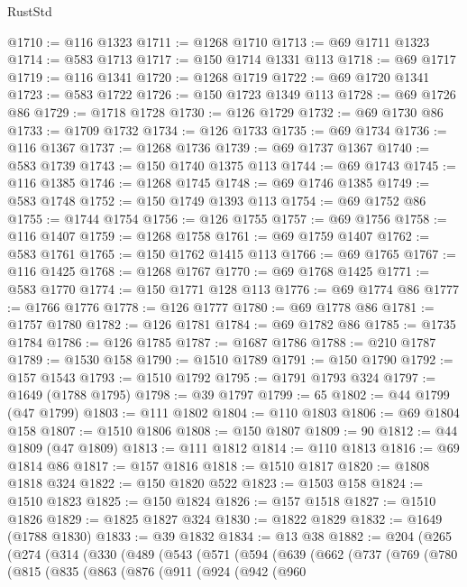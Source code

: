 \begin{lexlean}{RustStd}
\begin{coremodule}
@1710 := @116 @1323
@1711 := @1268 @1710
@1713 := @69 @1711 @1323
@1714 := @583 @1713
@1717 := @150 @1714 @1331 @113
@1718 := @69 @1717
@1719 := @116 @1341
@1720 := @1268 @1719
@1722 := @69 @1720 @1341
@1723 := @583 @1722
@1726 := @150 @1723 @1349 @113
@1728 := @69 @1726 @86
@1729 := @1718 @1728
@1730 := @126 @1729
@1732 := @69 @1730 @86
@1733 := @1709 @1732
@1734 := @126 @1733
@1735 := @69 @1734
@1736 := @116 @1367
@1737 := @1268 @1736
@1739 := @69 @1737 @1367
@1740 := @583 @1739
@1743 := @150 @1740 @1375 @113
@1744 := @69 @1743
@1745 := @116 @1385
@1746 := @1268 @1745
@1748 := @69 @1746 @1385
@1749 := @583 @1748
@1752 := @150 @1749 @1393 @113
@1754 := @69 @1752 @86
@1755 := @1744 @1754
@1756 := @126 @1755
@1757 := @69 @1756
@1758 := @116 @1407
@1759 := @1268 @1758
@1761 := @69 @1759 @1407
@1762 := @583 @1761
@1765 := @150 @1762 @1415 @113
@1766 := @69 @1765
@1767 := @116 @1425
@1768 := @1268 @1767
@1770 := @69 @1768 @1425
@1771 := @583 @1770
@1774 := @150 @1771 @128 @113
@1776 := @69 @1774 @86
@1777 := @1766 @1776
@1778 := @126 @1777
@1780 := @69 @1778 @86
@1781 := @1757 @1780
@1782 := @126 @1781
@1784 := @69 @1782 @86
@1785 := @1735 @1784
@1786 := @126 @1785
@1787 := @1687 @1786
@1788 := @210 @1787
@1789 := @1530 @158
@1790 := @1510 @1789
@1791 := @150 @1790
@1792 := @157 @1543
@1793 := @1510 @1792
@1795 := @1791 @1793 @324
@1797 := @1649 (@1788 @1795)
@1798 := @39 @1797
@1799 := 65
@1802 := @44 @1799 (@47 @1799)
@1803 := @111 @1802
@1804 := @110 @1803
@1806 := @69 @1804 @158
@1807 := @1510 @1806
@1808 := @150 @1807
@1809 := 90
@1812 := @44 @1809 (@47 @1809)
@1813 := @111 @1812
@1814 := @110 @1813
@1816 := @69 @1814 @86
@1817 := @157 @1816
@1818 := @1510 @1817
@1820 := @1808 @1818 @324
@1822 := @150 @1820 @522
@1823 := @1503 @158
@1824 := @1510 @1823
@1825 := @150 @1824
@1826 := @157 @1518
@1827 := @1510 @1826
@1829 := @1825 @1827 @324
@1830 := @1822 @1829
@1832 := @1649 (@1788 @1830)
@1833 := @39 @1832
@1834 := @13 @38
@1882 := @204
    (@265
      (@274
        (@314
          (@330
            (@489
              (@543
                (@571
                  (@594
                    (@639
                      (@662
                        (@737
                          (@769
                            (@780
                              (@815
                                (@835
                                  (@863
                                    (@876
                                      (@911
                                        (@924
                                          (@942
                                            (@960

\end{coremodule}
\end{lexlean}
